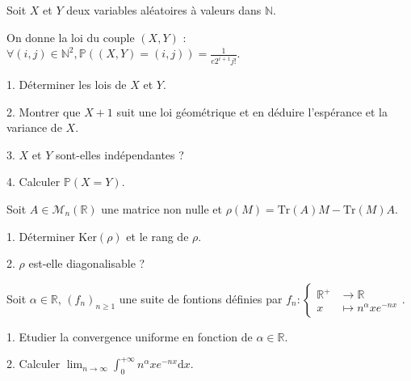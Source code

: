\subetoiles
\columnbreak



\noindent Soit $X$ et $Y$ deux variables aléatoires à valeurs dans $\mathbb{N}$.

\noindent On donne la loi du couple $(X,Y)$ :
$\displaystyle \forall (i,j) \in \mathbb{N}^2, \mathbb{P}((X,Y) = (i,j)) = \frac {1} {e2^{i+1}j!}$.

\vspace{5pt}
1. Déterminer les lois de $X$ et $Y$.

\vspace{5pt}
2. Montrer que $X+1$ suit une loi géométrique et en déduire l'espérance et la variance de $X$.

\vspace{5pt}
3. $X$ et $Y$ sont-elles indépendantes ?

\vspace{5pt}
4. Calculer $\mathbb{P}(X=Y)$.



\subetoiles



\noindent Soit $A \in \mathcal{M}_n(\mathbb{R})$ une matrice non nulle et
$\rho(M) = \mathrm{Tr}(A)M - \mathrm{Tr}(M)A$.

\vspace{5pt}
1. Déterminer $\mathrm{Ker}(\rho)$ et le rang de $\rho$.

\vspace{5pt}
2. $\rho$ est-elle diagonalisable ?



\subetoiles



Soit $\alpha \in \mathbb{R}$, $(f_n)_{n \geqslant 1}$ une suite de fontions définies par $f_n : 
\begin{cases}
  \mathbb{R}^+ & \longrightarrow \mathbb{R} \\    
  x & \longmapsto n^\alpha x e^{-nx}
\end{cases}
$.

\vspace{5pt}
1. Etudier la convergence uniforme en fonction de $\alpha \in \mathbb{R}$.

\vspace{5pt}
2. Calculer $\displaystyle \lim_{n\to\infty} \int_{0}^{+\infty}n^\alpha x e^{-nx}\mathrm{d}x$.



\subetoiles



